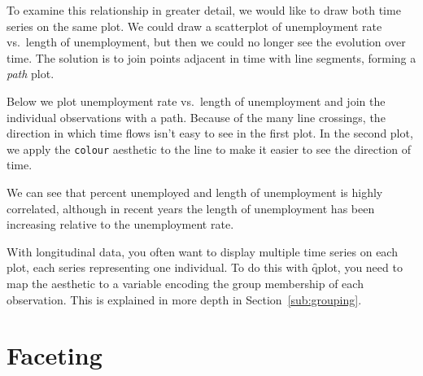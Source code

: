 % 


To examine this relationship in greater detail, we would like to draw both time series on the same plot. We could draw a scatterplot of unemployment rate vs.\ length of unemployment, but then we could no longer see the evolution over time. The solution is to join points adjacent in time with line segments, forming a \emph{path} plot.

Below we plot unemployment rate vs.\ length of unemployment and join the individual observations with a path. Because of the many line crossings, the direction in which time flows isn't easy to see in the first plot. In the second plot, we apply the {\tt colour} aesthetic to the line to make it easier to see the direction of time.

% 


We can see that percent unemployed and length of unemployment is highly correlated, although in recent years the length of unemployment has been increasing relative to the unemployment rate.

With longitudinal data, you often want to display multiple time series on each plot, each series representing one individual.  To do this with \f{qplot}, you need to map the  aesthetic to a variable encoding the group membership of each observation. This is explained in more depth in Section~\ref{sub:grouping}.

\section{Faceting}\label{sec:qplot-faceting}

